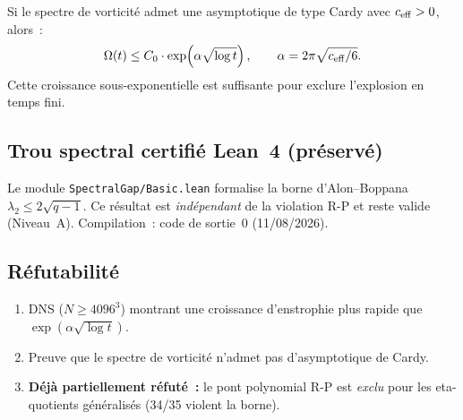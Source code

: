 \begin{conjecture}
Si le spectre de vorticité admet une asymptotique de type Cardy avec $c_{\mathrm{eff}} > 0$, alors~:
\[
  \Omega(t) \leq C_0 \cdot \exp\!\left(\alpha \sqrt{\log t}\right), \qquad \alpha = 2\pi\sqrt{c_{\mathrm{eff}}/6}.
\]
Cette croissance sous-exponentielle est suffisante pour exclure l'explosion en temps fini.
\end{conjecture}

\subsection{Trou spectral certifié Lean~4 (préservé)}

Le module \texttt{SpectralGap/Basic.lean} formalise la borne d'Alon--Boppana $\lambda_2 \leq 2\sqrt{q-1}$. Ce résultat est \emph{indépendant} de la violation R-P et reste valide (Niveau~A). Compilation~: code de sortie~0 (11/08/2026).

\subsection{Réfutabilité}
\begin{enumerate}
  \item DNS ($N \geq 4096^3$) montrant une croissance d'enstrophie plus rapide que $\exp(\alpha\sqrt{\log t})$.
  \item Preuve que le spectre de vorticité n'admet pas d'asymptotique de Cardy.
  \item \textbf{Déjà partiellement réfuté~:} le pont polynomial R-P est \emph{exclu} pour les eta-quotients généralisés (34/35 violent la borne).
\end{enumerate}
